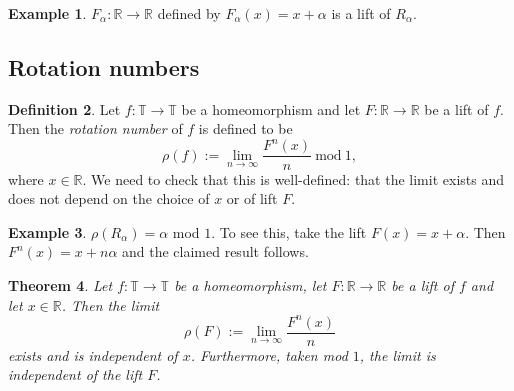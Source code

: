\documentclass[12pt]{article}
\newtheorem{theorem}{Theorem}[section]
\theoremstyle{definition}
\newtheorem{definition}[theorem]{Definition}
\newtheorem{example}[theorem]{Example}
\theoremstyle{remark}
\begin{document}


\begin{example}
$F_\alpha :\mathbb R \to \mathbb R$ defined by $F_\alpha(x)=x+\alpha$ is a lift of $R_\alpha$.
\end{example}


\subsection{Rotation numbers}

\begin{definition} \label{def_of_rot_number}
Let $f : \mathbb T \to \mathbb T$ be a homeomorphism and let $F: \mathbb R \to \mathbb R$ be a lift of $f$.
Then the {\it rotation number} of $f$ is defined to be
\[
\rho(f) := \lim_{n \to \infty} \frac{F^n(x)}{n} \ \mathrm{mod} \ 1,
\]
where $x \in \mathbb R$.
We need to check that this is well-defined: that the limit exists and does not depend on the
choice of $x$ or of lift $F$.
\end{definition}

\begin{example}
$\rho(R_\alpha) = \alpha$ mod $1$. To see this, take the lift $F(x) = x+ \alpha$. Then $F^n(x) =x+n\alpha$
and the claimed result follows.
\end{example}

\begin{theorem} \label{rot_number_well-defined}
Let $f : \mathbb T \to \mathbb T$ be 
a homeomorphism, let $F: \mathbb R \to \mathbb R$ be a lift of $f$ and let $x \in \mathbb R$.
Then the limit
\[ 
\rho(F):= \lim_{n \to \infty} \frac{F^n(x)}{n}
 \]
 exists and is independent of $x$. Furthermore, taken mod $1$, the limit is independent of the lift $F$.
\end{theorem}
\end{document}

